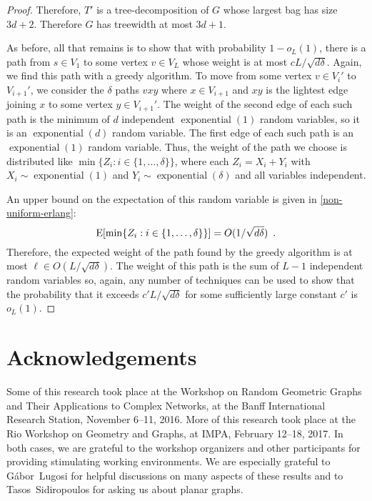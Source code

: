 \documentclass[lotsofwhite]{patmorin}
\DeclareMathOperator{\exponential}{exponential}
\begin{document}
\begin{proof}
  Therefore, $T'$ is a tree-decomposition of $G$ whose largest bag
  has size $3d+2$.  Therefore $G$ has treewidth at most $3d+1$.

  As before, all that remains is to show that with probability $1-o_L(1)$,
  there is a path from $s\in V_1$ to some vertex $v\in V_{L}$ whose
  weight is at most $cL/\sqrt{d\delta}$.  Again, we find this path with a
  greedy algorithm.  To move from some vertex $v\in V_i'$ to $V_{i+1}'$,
  we consider the $\delta$ paths $vxy$ where $x\in V_{i+1}$ and
  $xy$ is the lightest edge joining $x$ to some vertex $y\in V_{i+1}'$.
  The weight of the second edge of each such path is the minimum of
  $d$ independent $\exponential(1)$ random variables, so it is an
  $\exponential(d)$ random variable.  The first edge of each such path
  is an $\exponential(1)$ random variable.  Thus, the weight of the path
  we choose is distributed like $\min\{Z_i:i\in\{1,\ldots,\delta\}\}$,
  where each $Z_i=X_i+Y_i$ with $X_i\sim \exponential(1)$ and
  $Y_i\sim\exponential(\delta)$ and all variables independent.

  An upper bound on the expectation of this random variable is given
  in \eqref{non-uniform-erlang}:
  \[ 
      \mathrm{E}[\min\{Z_i:i\in\{1,\ldots,\delta\}\}] = O(1/\sqrt{d\delta}) \enspace .
  \]
  Therefore, the expected weight of the path found by the greedy
  algorithm is at most $\ell \in O(L/\sqrt{d\delta})$.  The weight of
  this path is the sum of $L-1$ independent random variables so, again,
  any number of techniques can be used to show that the probability that
  it exceeds $c'L/\sqrt{d\delta}$ for some sufficiently large constant
  $c'$ is $o_L(1)$.
\end{proof}

 
\section*{Acknowledgements}

Some of this research took place at the Workshop on Random Geometric
Graphs and Their Applications to Complex Networks, at the Banff
International Research Station, November 6--11, 2016.  More of this
research took place at the Rio Workshop on Geometry and Graphs, at IMPA,
February 12--18, 2017.  In both cases, we are grateful to the workshop
organizers and other participants for providing stimulating working
environments.  We are especially grateful to G\'abor~Lugosi for helpful
discussions on many aspects of these results and to Tasos~Sidiropoulos
for asking us about planar graphs.
\end{document}
